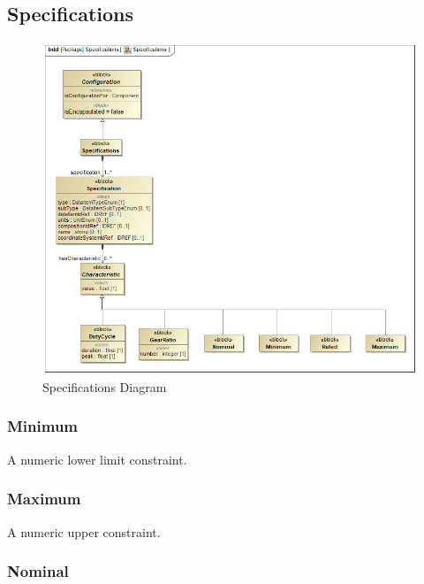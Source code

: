\subsection{Specifications} \label{sec:Specifications}


\begin{figure}[ht]
  \centering
    \includegraphics[width=1.0\textwidth]{figures/Specifications.png}
  \caption{Specifications Diagram}
  \label{fig:Specifications}
\end{figure}

\FloatBarrier



\subsubsection{Minimum}
\label{sec:Minimum}



A numeric lower limit constraint.


\subsubsection{Maximum}
\label{sec:Maximum}



A numeric upper constraint.



\subsubsection{Nominal}
\label{sec:Nominal}



